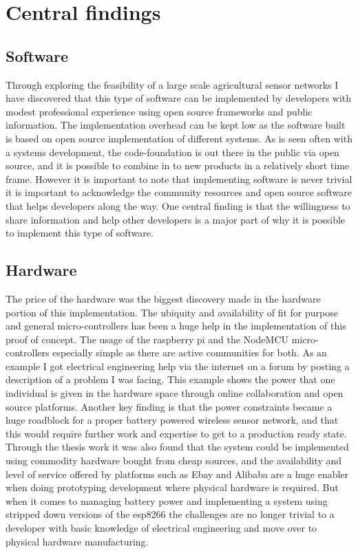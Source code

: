 \documentclass[]{uiophd}
\begin{document}
\section{Central findings}
\subsection{Software}
Through exploring the feasibility of a large scale agricultural sensor networks I have discovered that this type of software can be implemented by developers with modest professional experience using open source frameworks and public information. The implementation overhead can be kept low as the software built is based on open source implementation of different systems. As is seen often with a systems development, the code-foundation is out there in the public via open source, and it is possible to combine in to new products in a relatively short time frame. However it is important to note that implementing software is never trivial it is important to acknowledge the community resources and open source software that helps developers along the way. One central finding is that the willingness to share information and help other developers is a major part of why it is possible to implement this type of software.

\subsection{Hardware}
The price of the hardware was the biggest discovery made in the hardware portion of this implementation. The ubiquity and availability of fit for purpose and general micro-controllers has been a huge help in the implementation of this proof of concept. The usage of the raspberry pi and the NodeMCU micro-controllers especially simple as there are active communities for both. As an example I got electrical engineering help via the internet on a forum by posting a description of a problem I was facing. This example shows the power that one individual is given in the hardware space through online collaboration and open source platforms.  Another key finding is that the power constraints became a huge roadblock for a proper battery powered wireless sensor network, and that this would require further work and expertise to get to a production ready state. Through the thesis work it was also found that the system could be implemented using commodity hardware bought from cheap sources, and the availability and level of service offered by platforms such as Ebay and Alibaba are a huge enabler when doing prototyping development where physical hardware is required. But when it comes to managing battery power and implementing a system using stripped down versions of the esp8266\cite{espressif} the challenges are no longer trivial to a developer with basic knowledge of electrical engineering and move over to physical hardware manufacturing.
\end{document}
